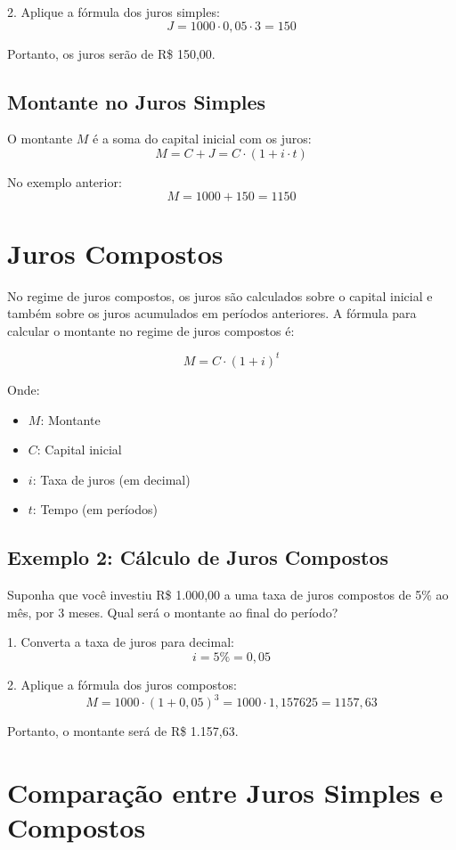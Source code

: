 \documentclass[11pt]{article}
\begin{document}
\begin{multicols}{2}
2. Aplique a fórmula dos juros simples:
\[
J = 1000 \cdot 0,05 \cdot 3 = 150
\]

Portanto, os juros serão de R\$ 150,00.

\subsection*{Montante no Juros Simples}

O montante \( M \) é a soma do capital inicial com os juros:
\[
M = C + J = C \cdot (1 + i \cdot t)
\]

No exemplo anterior:
\[
M = 1000 + 150 = 1150
\]

\section*{Juros Compostos}

No regime de juros compostos, os juros são calculados sobre o capital inicial e também sobre os juros acumulados em períodos anteriores. A fórmula para calcular o montante no regime de juros compostos é:

\[
M = C \cdot (1 + i)^t
\]

Onde:

\begin{itemize}
    \item \( M \): Montante
    \item \( C \): Capital inicial
    \item \( i \): Taxa de juros (em decimal)
    \item \( t \): Tempo (em períodos)
\end{itemize}
\subsection*{Exemplo 2: Cálculo de Juros Compostos}

Suponha que você investiu R\$ 1.000,00 a uma taxa de juros compostos de 5\% ao mês, por 3 meses. Qual será o montante ao final do período?

1. Converta a taxa de juros para decimal:
\[
i = 5\% = 0,05
\]

2. Aplique a fórmula dos juros compostos:
\[
M = 1000 \cdot (1 + 0,05)^3 = 1000 \cdot 1,157625 = 1157,63
\]

Portanto, o montante será de R\$ 1.157,63.

\section*{Comparação entre Juros Simples e Compostos}


\end{multicols}
\end{document}
